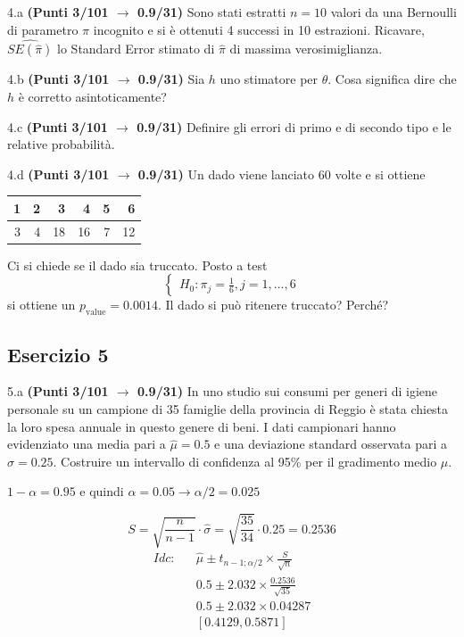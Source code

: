 \documentclass[
  11pt,
]{book}
\theoremstyle{mytheoremstyle}
\theoremstyle{mydefstyle}
\newenvironment{sol}
  {
  \begin{tcolorbox}[enhanced,breakable,arc=0.1mm,boxrule=1pt,colback=white,colframe=iblue,
  title=\bf \fontfamily{lmss}\selectfont \hspace{.5 cm} Soluzione,drop fuzzy shadow]

}{
\end{tcolorbox}
  }
\begin{document}
4.a \textbf{(Punti 3/101 \(\rightarrow\) 0.9/31)} Sono stati estratti \(n=10\) valori da una Bernoulli di parametro \(\pi\) incognito e si è ottenuti 4 successi in 10 estrazioni. Ricavare, \(\widehat{SE(\hat\pi)}\) lo Standard Error stimato di \(\hat\pi\) di massima verosimiglianza.

4.b \textbf{(Punti 3/101 \(\rightarrow\) 0.9/31)} Sia \(h\) uno stimatore per \(\theta\). Cosa significa dire che \(h\) è corretto asintoticamente?

4.c \textbf{(Punti 3/101 \(\rightarrow\) 0.9/31)} Definire gli errori di primo e di secondo tipo e le relative probabilità.

4.d \textbf{(Punti 3/101 \(\rightarrow\) 0.9/31)} Un dado viene lanciato 60 volte e si ottiene

\begin{table}[H]
\centering
\begin{tabular}{rrrrrr}
\toprule
1 & 2 & 3 & 4 & 5 & 6\\
\midrule
3 & 4 & 18 & 16 & 7 & 12\\
\bottomrule
\end{tabular}
\end{table}

Ci si chiede se il dado sia truccato. Posto a test
\[
\begin{cases}
H_0:\pi_j=\frac 16, j = 1,...,6
\end{cases}
\]
si ottiene un \(p_{\text{value}}=0.0014\). Il dado si può ritenere truccato? Perché?

\subsection{Esercizio 5}\label{esercizio-5-25}

5.a \textbf{(Punti 3/101 \(\rightarrow\) 0.9/31)} In uno studio sui consumi per generi di igiene personale su un campione di 35 famiglie della provincia di Reggio è stata chiesta la loro spesa annuale in questo genere di beni. I dati campionari hanno evidenziato una media pari a \(\hat\mu=0.5\) e una deviazione standard osservata pari a \(\hat\sigma=0.25\).
Costruire un intervallo di confidenza al 95\% per il gradimento medio \(\mu\).

\begin{sol}
\(1-\alpha =0.95\) e quindi \(\alpha=0.05\rightarrow \alpha/2=0.025\)

\[
      S  =\sqrt{\frac {n}{n-1}}\cdot\hat\sigma =
     \sqrt{\frac { 35 }{ 34 }}\cdot 0.25 = 0.2536 
\]
\begin{eqnarray*}
  Idc: & &  \hat\mu \pm  t_{n-1;\alpha/2} \times \frac{S}{\sqrt{n}} \\
     & &  0.5 \pm  2.032 \times \frac{ 0.2536 }{\sqrt{ 35 }} \\
     & &  0.5 \pm  2.032 \times  0.04287 \\
     & & [ 0.4129 ,  0.5871 ]
\end{eqnarray*}

\end{sol}
\end{document}
